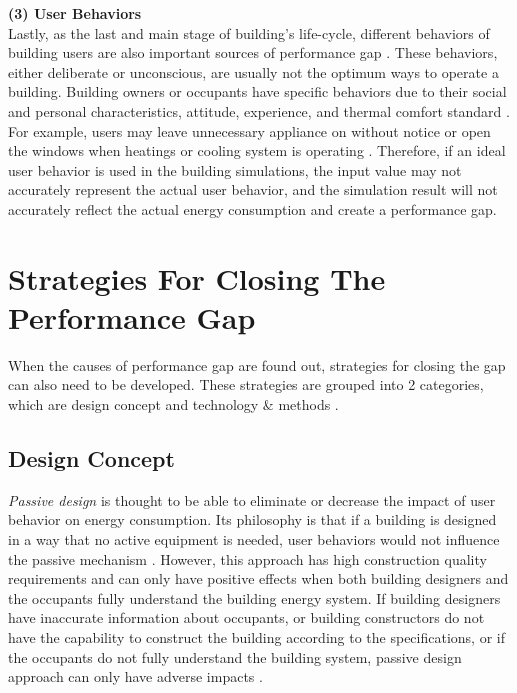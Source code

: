 \documentclass[a4paper, oneside]{discothesis}
\begin{document}
		\textbf{(3) User Behaviors}\\
		Lastly, as the last and main stage of building's life-cycle, different behaviors of building users are also important sources of performance gap \cite{ZOU2018165}. These behaviors, either deliberate or unconscious, are usually not the optimum ways to operate a building. Building owners or occupants have specific behaviors due to their social and personal characteristics, attitude, experience, and thermal comfort standard \cite{userevaluations,LAWRENCE2016651}. For example, users may leave unnecessary appliance on without notice or open the windows when heatings or cooling system is operating \cite{FREI2017421}. Therefore, if an ideal user behavior is used in the building simulations, the input value may not accurately represent the actual user behavior, and the simulation result will not accurately reflect the actual energy consumption and create a performance gap.\\

	\section{Strategies For Closing The Performance Gap} 
		When the causes of performance gap are found out, strategies for closing the gap can also need to be developed. These strategies are grouped into 2 categories, which are design concept and technology \& methods \cite{ZOU2018165}.

		\subsection{Design Concept}
			\textit{Passive design} is thought to be able to eliminate or decrease the impact of user behavior on energy consumption. Its philosophy is that if a building is designed in a way that no active equipment is needed, user behaviors would not influence the passive mechanism \cite{BLIGHT2013183,NORFORD1994121}. However, this approach has high construction quality requirements and can only have positive effects when both building designers and the occupants fully understand the building energy system. If building designers have inaccurate information about occupants, or building constructors do not have the capability to construct the building according to the specifications, or if the occupants do not fully understand the building system, passive design approach can only have adverse impacts \cite{ZOU2018165}.\\
\end{document}
